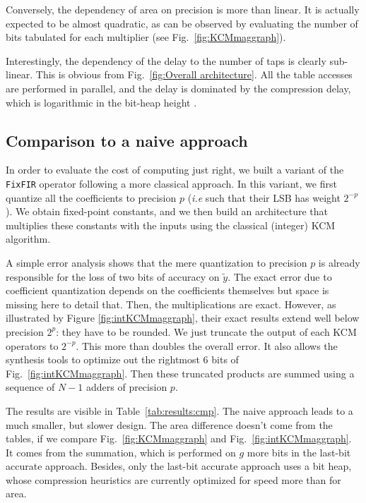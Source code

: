 \documentclass[twocolumn]{IEEEtran}
\begin{document}
Conversely, the dependency of area on precision is more than linear. 
It is actually expected to be almost quadratic, as can be observed by evaluating the number of bits tabulated for each multiplier (see Fig.~\ref{fig:KCMmaggraph}).

Interestingly, the dependency of the delay to the number of taps is clearly sub-linear.
This is obvious from Fig.~\ref{fig:Overall architecture}. 
All the table accesses are performed in parallel, and the delay is dominated by the compression delay, which is logarithmic in the bit-heap height \cite{Dadda1965}.


\subsection{Comparison to a naive approach}

In order to evaluate the cost of computing just right, we built a variant of the \texttt{FixFIR} operator following a more classical approach.
In this variant, we first quantize all the coefficients to precision $p$ (\emph{i.e} such that their LSB has weight $2^{-p}$).
We obtain fixed-point constants, and we then build an architecture that multiplies these constants with the inputs using the classical (integer) KCM algorithm.

A simple error analysis shows that the mere quantization to precision $p$ is already responsible for the loss of two bits of accuracy on $\widetilde{y}$. 
The exact error due to coefficient quantization depends on the coefficients themselves but space is missing here to detail that.
Then, the multiplications are exact. 
However, as illustrated by Figure \ref{fig:intKCMmaggraph}, their exact results extend well below precision $2^p$: they have to be rounded.
We just truncate the output of each KCM operators to  $2^{-p}$.
This more than doubles the overall error. 
It also allows the synthesis tools to optimize out the rightmost 6 bits of Fig.~\ref{fig:intKCMmaggraph}.
Then these truncated products are summed using a sequence of $N-1$ adders of precision $p$.

The results are visible in Table~\ref{tab:results:cmp}. 
The naive approach leads to a much smaller, but slower design. 
The area difference doesn't come from the tables, if we compare Fig.~\ref{fig:KCMmaggraph} and Fig.~\ref{fig:intKCMmaggraph}. 
It comes from the summation, which is performed on $g$ more bits in the last-bit accurate approach.
Besides, only the last-bit accurate approach uses a bit heap, whose compression heuristics are currently optimized for speed more than for area.
\end{document}
